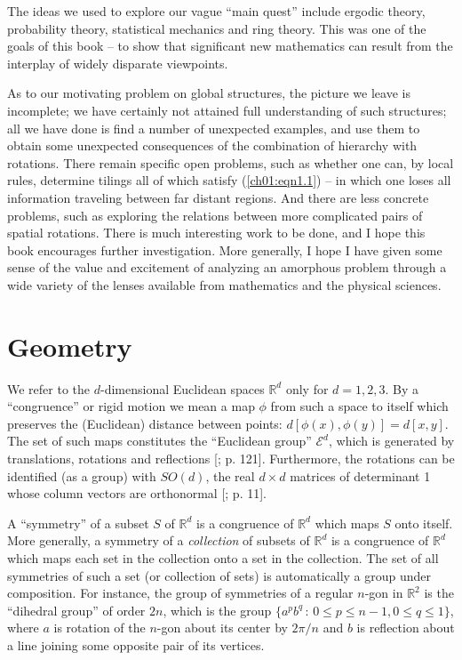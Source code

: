 \documentclass[reqno]{stml-l}
\theoremstyle{plain}
\theoremstyle{definition}
\numberwithin{equation}{chapter}
\begin{document}
The ideas we used to explore our vague ``main quest'' include ergodic theory, probability theory, statistical mechanics and ring theory. This was one of the goals of this book -- to show that significant new mathematics can result from the interplay of widely disparate viewpoints.

As to our motivating problem on global structures, the picture we leave is incomplete; we have certainly not attained full understanding of such structures; all we have done is find a number of unexpected examples, and use them to obtain some unexpected consequences of the combination of hierarchy with rotations. There remain specific open problems, such as whether one can, by local rules, determine tilings all of which satisfy (\ref{ch01:eqn1.1}) -- in which one loses all information traveling between far distant regions. And there are less concrete
problems, such as exploring the relations between more complicated pairs of spatial rotations. There is much interesting work to be done, and I hope this book encourages further investigation. More generally, I hope I have given some sense of the value and excitement of analyzing an amorphous problem through a wide variety of the lenses available from mathematics and the physical sciences.



\appendix
\chapter{Geometry \label{appI:appI}}

We refer to the $d$-dimensional Euclidean spaces $\mathbb{R}^{d}$ only for $d=1,2,3$. By a ``congruence'' or rigid motion we mean a map $\phi$ from such a space to itself which preserves the (Euclidean) distance between points: $d[\phi(x), \phi(y)]=d[x, y]$. The set of such maps constitutes the ``Euclidean group'' $\mathcal{E}^{d}$, which is generated by translations, rotations and reflections [; p. 121]. Furthermore, the rotations can be identified (as a group) with $SO(d)$, the real $d\times d$ matrices of determinant 1 whose column vectors are orthonormal [; p. 11].

A ``symmetry'' of a subset $S$ of $\mathbb{R}^{d}$ is a congruence of $\mathbb{R}^{d}$ which maps $S$ onto itself. More generally, a symmetry of a \emph{collection} of subsets of $\mathbb{R}^{d}$ is a congruence of $\mathbb{R}^{d}$ which maps each set in the collection onto a set in the collection. The set of all symmetries of such a set (or collection of sets) is automatically a group under composition. For instance, the group of symmetries of a regular $n$-gon in $\mathbb{R}^{2}$ is the ``dihedral group'' of order $2n$, which is the group $\{a^{p}b^{q}\,:\,0\leq p\leq n-1,0\leq q\leq 1\}$, where $a$ is rotation of the $n$-gon about its center by $2\pi/n$ and $b$ is reflection about a line joining some opposite pair of its vertices.
\end{document}
